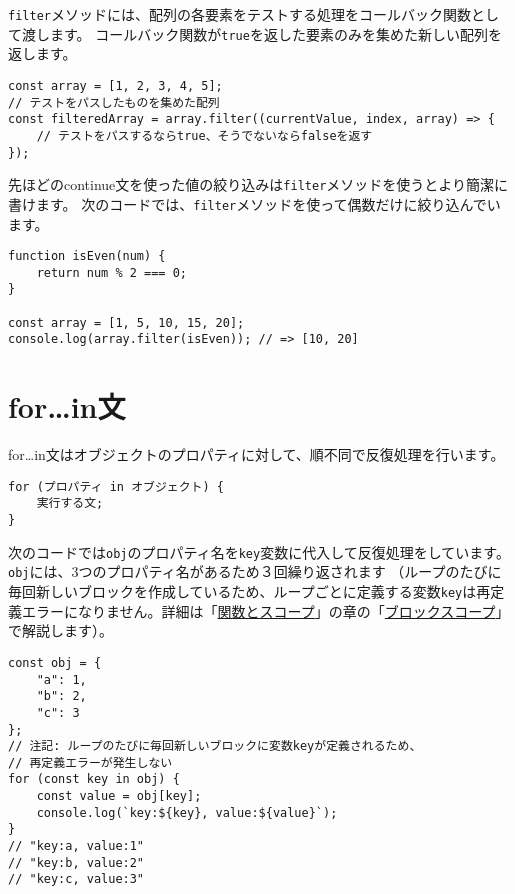 \texttt{filter}メソッドには、配列の各要素をテストする処理をコールバック関数として渡します。
コールバック関数が\texttt{true}を返した要素のみを集めた新しい配列を返します。

\begin{lstlisting}
const array = [1, 2, 3, 4, 5];
// テストをパスしたものを集めた配列
const filteredArray = array.filter((currentValue, index, array) => {
    // テストをパスするならtrue、そうでないならfalseを返す
});
\end{lstlisting}

先ほどのcontinue文を使った値の絞り込みは\texttt{filter}メソッドを使うとより簡潔に書けます。
次のコードでは、\texttt{filter}メソッドを使って偶数だけに絞り込んでいます。

\begin{lstlisting}
function isEven(num) {
    return num % 2 === 0;
}

const array = [1, 5, 10, 15, 20];
console.log(array.filter(isEven)); // => [10, 20]
\end{lstlisting}

\hypertarget{for-in-statement}{%
\section{for\ldots{}in文}\label{for-in-statement}}

for\ldots{}in文はオブジェクトのプロパティに対して、順不同で反復処理を行います。

\begin{lstlisting}
for (プロパティ in オブジェクト) {
    実行する文;
}
\end{lstlisting}

次のコードでは\texttt{obj}のプロパティ名を\texttt{key}変数に代入して反復処理をしています。
\texttt{obj}には、3つのプロパティ名があるため３回繰り返されます
（ループのたびに毎回新しいブロックを作成しているため、ループごとに定義する変数\texttt{key}は再定義エラーになりません。詳細は「\hyperlink{function-and-scope}{関数とスコープ}」の章の「\hyperlink{block-scope}{ブロックスコープ}」で解説します）。

\begin{lstlisting}
const obj = {
    "a": 1,
    "b": 2,
    "c": 3
};
// 注記: ループのたびに毎回新しいブロックに変数keyが定義されるため、
// 再定義エラーが発生しない
for (const key in obj) {
    const value = obj[key];
    console.log(`key:${key}, value:${value}`);
}
// "key:a, value:1"
// "key:b, value:2"
// "key:c, value:3"
\end{lstlisting}

